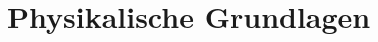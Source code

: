 \documentclass[../bericht.tex]{subfiles}
\begin{document}
  \chapter{Physikalische Grundlagen}
\end{document}

